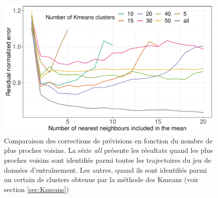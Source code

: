 \documentclass[12pt]{report}
\begin{document}
\begin{figure}[h]
	\centering
	\includegraphics[width=0.75\linewidth]{Images/PV/KNN/KNN_compare.pdf}
	\caption{Comparaison des corrections de prévisions en fonction du nombre de plus proches voisins. La série \textit{all} présente les résultats quand les plus proches voisins sont identifiés parmi toutes les trajectoires du jeu de données d'entraînement. Les autres, quand ils sont identifiés parmi un certain de clusters obtenus par la méthode des Kmeans (voir section \ref{sec:Kmeans})}
	\label{fig:KNN_Comp}
\end{figure}
\end{document}
